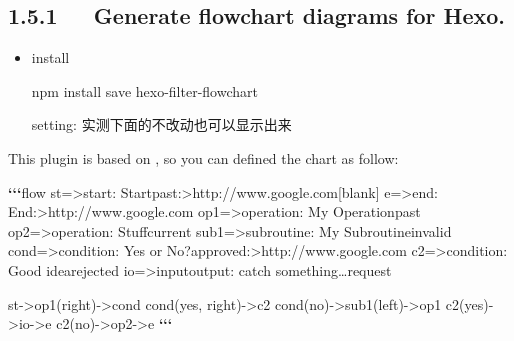 \documentclass[letterpaper,12pt,english]{sphinxmanual}
\begin{document}
\subsection{1.5.1   Generate flowchart diagrams for Hexo.}
\label{\detokenize{001software/001install/001._u7f51_u7ad9/hexo:generate-flowchart-diagrams-for-hexo}}
\begin{itemize}
\item {} 
install

npm install \textendash{}save hexo-filter-flowchart

setting: 实测下面的不改动也可以显示出来

\begin{sphinxVerbatim}[commandchars=\\\{\}]
  

   
\end{sphinxVerbatim}

\end{itemize}

This plugin is based on , so you can defined the chart as follow:

{\color{red}\bfseries{}{}`{}`}{\color{red}\bfseries{}{}`}flow
st=\textgreater{}start: Start\textbar{}past:\textgreater{}http://www.google.com{[}blank{]}
e=\textgreater{}end: End:\textgreater{}http://www.google.com
op1=\textgreater{}operation: My Operation\textbar{}past
op2=\textgreater{}operation: Stuff\textbar{}current
sub1=\textgreater{}subroutine: My Subroutine\textbar{}invalid
cond=\textgreater{}condition: Yes
or No?\textbar{}approved:\textgreater{}http://www.google.com
c2=\textgreater{}condition: Good idea\textbar{}rejected
io=\textgreater{}inputoutput: catch something…\textbar{}request

st-\textgreater{}op1(right)-\textgreater{}cond
cond(yes, right)-\textgreater{}c2
cond(no)-\textgreater{}sub1(left)-\textgreater{}op1
c2(yes)-\textgreater{}io-\textgreater{}e
c2(no)-\textgreater{}op2-\textgreater{}e
{\color{red}\bfseries{}{}`{}`}{\color{red}\bfseries{}{}`}
\end{document}
